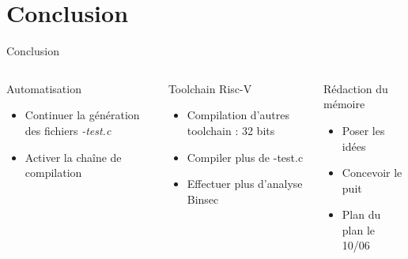 \documentclass[A4,svgnames,9pt,aspectratio=169]{beamer}
\begin{document}



\section{Conclusion}
\frame{\sectionpage}

\begin{frame}{Conclusion}

  \begin{columns}
    \begin{column}{0.3\textwidth}
      \begin{minipage}[t][2cm][t]{\linewidth}
        \begin{block}{Automatisation}
          \begin{itemize}
            \item Continuer la génération des fichiers \textit{-test.c}
            \item Activer la chaîne de compilation
          \end{itemize}
        \end{block}
      \end{minipage}
    \end{column}
    \pause
    \begin{column}{0.3\textwidth}
      \begin{minipage}[t][2cm][t]{\linewidth}
        \begin{block}{Toolchain Risc-V}
          \begin{itemize}
            \item Compilation d'autres toolchain : 32 bits
            \item Compiler plus de -test.c
            \item Effectuer plus d'analyse Binsec
          \end{itemize}
        \end{block}
      \end{minipage}
    \end{column}
    \pause
    \begin{column}{0.3\textwidth}
      \begin{minipage}[t][2cm][t]{\linewidth}
        \begin{block}{Rédaction du mémoire}
          \begin{itemize}
            \item Poser les idées
            \item Concevoir le puit
            \item Plan du plan le 10/06
          \end{itemize}
        \end{block}
      \end{minipage}
    \end{column}
  \end{columns}

\end{frame}


\frame{\merci}
\end{document}
